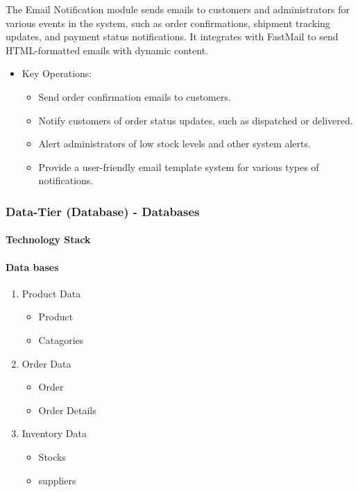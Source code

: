 \documentclass{llncs}
\begin{document}
The Email Notification module sends emails to customers and administrators for various events in the system, such as order confirmations, shipment tracking updates, and payment status notifications. It integrates with FastMail to send HTML-formatted emails with dynamic content.
\begin{itemize}
    \item Key Operations:
    \begin{itemize}   
        \item Send order confirmation emails to customers.
        \item Notify customers of order status updates, such as dispatched or delivered.
        \item Alert administrators of low stock levels and other system alerts.
        \item Provide a user-friendly email template system for various types of notifications.
    \end{itemize}   
\end{itemize}

\subsubsection{Data-Tier (Database) - Databases}
\paragraph{Technology Stack}
\paragraph{Data bases}
\begin{enumerate}
    \item Product Data
    \begin{itemize}
        \item Product
        \item Catagories
    \end{itemize}
    \item Order Data
    \begin{itemize}
        \item Order 
        \item Order Details
     \end{itemize}
    \item Inventory Data
    \begin{itemize}
        \item Stocks 
        \item suppliers
    \end{itemize}
\end{enumerate}
\end{document}
